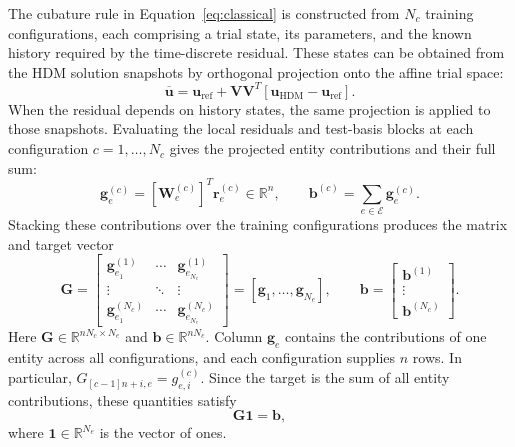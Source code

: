 \documentclass[a4paper,12pt]{article}
\newcommand{\vect}[1]{\boldsymbol{#1}}
\newcommand{\matr}[1]{\boldsymbol{#1}}
\begin{document}
The cubature rule in Equation~\eqref{eq:classical} is constructed from $N_c$ training configurations, each comprising a trial state, its parameters, and the known history required by the time-discrete residual. These states can be obtained from the HDM solution snapshots by orthogonal projection onto the affine trial space:
\begin{equation}
 \overline{\vect{u}}
 =\vect{u}_{\mathrm{ref}}+\matr{V}\matr{V}^T
    [\vect{u}_{\mathrm{HDM}}-\vect{u}_{\mathrm{ref}}].
 \label{eq:projection}
\end{equation}
When the residual depends on history states, the same projection is applied to those snapshots. Evaluating the local residuals and test-basis blocks at each configuration $c=1,\ldots,N_c$ gives the projected entity contributions and their full sum:
\begin{equation}
 \vect{g}_e^{(c)}=[\matr{W}_e^{(c)}]^T\vect{r}_e^{(c)}\in\mathbb R^n,
 \qquad
 \vect{b}^{(c)}=\sum_{e\in\mathcal E}\vect{g}_e^{(c)}.
 \label{eq:sampled-training-contribution}
\end{equation}
Stacking these contributions over the training configurations produces the matrix and target vector
\begin{equation}
 \matr{G}=
 \begin{bmatrix}
   \vect{g}_{e_1}^{(1)}&\cdots&\vect{g}_{e_{N_e}}^{(1)}\\
   \vdots&\ddots&\vdots\\
   \vect{g}_{e_1}^{(N_c)}&\cdots&\vect{g}_{e_{N_e}}^{(N_c)}
 \end{bmatrix}
 =[\vect{g}_1,\ldots,\vect{g}_{N_e}],
 \qquad
 \vect{b}=
 \begin{bmatrix}
   \vect{b}^{(1)}\\ \vdots\\ \vect{b}^{(N_c)}
 \end{bmatrix}.
 \label{eq:training-matrix}
\end{equation}
Here $\matr{G}\in\mathbb R^{nN_c\times N_e}$ and $\vect{b}\in\mathbb R^{nN_c}$. Column $\vect{g}_e$ contains the contributions of one entity across all configurations, and each configuration supplies $n$ rows. In particular, $G_{[c-1]n+i,e}=g_{e,i}^{(c)}$. Since the target is the sum of all entity contributions, these quantities satisfy
\begin{equation}
 \matr{G}\vect{1}=\vect{b},
 \label{eq:training-assembly}
\end{equation}
where $\vect{1}\in\mathbb R^{N_e}$ is the vector of ones.
\end{document}

